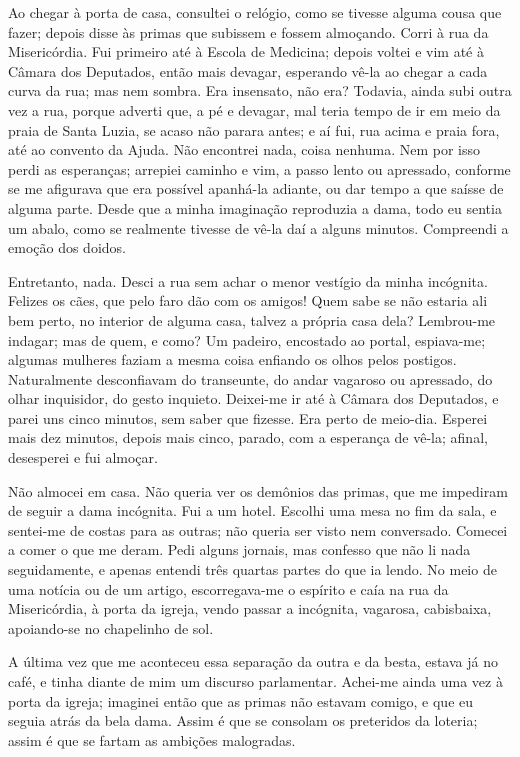 Ao chegar à porta de casa, consultei o relógio, como se tivesse alguma
cousa que fazer; depois disse às primas que subissem e fossem almoçando.
Corri à rua da Misericórdia. Fui primeiro até à Escola de Medicina;
depois voltei e vim até à Câmara dos Deputados, então mais devagar,
esperando vê-la ao chegar a cada curva da rua; mas nem sombra. Era
insensato, não era? Todavia, ainda subi outra vez a rua, porque adverti
que, a pé e devagar, mal teria tempo de ir em meio da praia de Santa
Luzia, se acaso não parara antes; e aí fui, rua acima e praia fora, até
ao convento da Ajuda. Não encontrei nada, coisa nenhuma. Nem por isso
perdi as esperanças; arrepiei caminho e vim, a passo lento ou apressado,
conforme se me afigurava que era possível apanhá-la adiante, ou dar
tempo a que saísse de alguma parte. Desde que a minha imaginação
reproduzia a dama, todo eu sentia um abalo, como se realmente tivesse de
vê-la daí a alguns minutos. Compreendi a emoção dos doidos.

Entretanto, nada. Desci a rua sem achar o menor vestígio da minha
incógnita. Felizes os cães, que pelo faro dão com os amigos! Quem sabe
se não estaria ali bem perto, no interior de alguma casa, talvez a
própria casa dela? Lembrou-me indagar; mas de quem, e como? Um padeiro,
encostado ao portal, espiava-me; algumas mulheres faziam a mesma coisa
enfiando os olhos pelos postigos. Naturalmente desconfiavam do
transeunte, do andar vagaroso ou apressado, do olhar inquisidor, do
gesto inquieto. Deixei-me ir até à Câmara dos Deputados, e parei uns
cinco minutos, sem saber que fizesse. Era perto de meio-dia. Esperei
mais dez minutos, depois mais cinco, parado, com a esperança de vê-la;
afinal, desesperei e fui almoçar.

Não almocei em casa. Não queria ver os demônios das primas, que me
impediram de seguir a dama incógnita. Fui a um hotel. Escolhi uma mesa
no fim da sala, e sentei-me de costas para as outras; não queria ser
visto nem conversado. Comecei a comer o que me deram. Pedi alguns
jornais, mas confesso que não li nada seguidamente, e apenas entendi
três quartas partes do que ia lendo. No meio de uma notícia ou de um
artigo, escorregava-me o espírito e caía na rua da Misericórdia, à porta
da igreja, vendo passar a incógnita, vagarosa, cabisbaixa, apoiando-se
no chapelinho de sol.

A última vez que me aconteceu essa separação da outra e da besta, estava
já no café, e tinha diante de mim um discurso parlamentar. Achei-me
ainda uma vez à porta da igreja; imaginei então que as primas não
estavam comigo, e que eu seguia atrás da bela dama. Assim é que se
consolam os preteridos da loteria; assim é que se fartam as ambições
malogradas.

